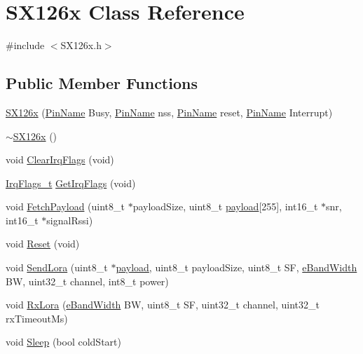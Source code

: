 \hypertarget{class_s_x126x}{}\section{S\+X126x Class Reference}
\label{class_s_x126x}


{\ttfamily \#include $<$S\+X126x.\+h$>$}

\subsection*{Public Member Functions}
\begin{DoxyCompactItemize}
\item 
\mbox{\hyperlink{class_s_x126x_a325ba815822bd31fcae9d4effcc1aea5}{S\+X126x}} (\mbox{\hyperlink{_class_s_t_m32_l0_8h_a5ceb873075d76667eb54dc6a7d2734d1}{Pin\+Name}} Busy, \mbox{\hyperlink{_class_s_t_m32_l0_8h_a5ceb873075d76667eb54dc6a7d2734d1}{Pin\+Name}} nss, \mbox{\hyperlink{_class_s_t_m32_l0_8h_a5ceb873075d76667eb54dc6a7d2734d1}{Pin\+Name}} reset, \mbox{\hyperlink{_class_s_t_m32_l0_8h_a5ceb873075d76667eb54dc6a7d2734d1}{Pin\+Name}} Interrupt)
\item 
\mbox{\hyperlink{class_s_x126x_ade46beffc61c639d93c2cad02b92c902}{$\sim$\+S\+X126x}} ()
\item 
void \mbox{\hyperlink{class_s_x126x_a0e9939c82c76d571d71a69d6941a6780}{Clear\+Irq\+Flags}} (void)
\item 
\mbox{\hyperlink{_define_8h_ab50e1f84d728c6ede52a9606a2a262d5}{Irq\+Flags\+\_\+t}} \mbox{\hyperlink{class_s_x126x_ac50ac9d688ef2647e10d471f3cdf0ec0}{Get\+Irq\+Flags}} (void)
\item 
void \mbox{\hyperlink{class_s_x126x_a53fde8ee3d816f58b1c493195fd96872}{Fetch\+Payload}} (uint8\+\_\+t $\ast$payload\+Size, uint8\+\_\+t \mbox{\hyperlink{structpayload}{payload}}\mbox{[}255\mbox{]}, int16\+\_\+t $\ast$snr, int16\+\_\+t $\ast$signal\+Rssi)
\item 
void \mbox{\hyperlink{class_s_x126x_a062d1439cea26e3e531e5df8ade82f0b}{Reset}} (void)
\item 
void \mbox{\hyperlink{class_s_x126x_a9199137a513971e5af0b5be2637cb19a}{Send\+Lora}} (uint8\+\_\+t $\ast$\mbox{\hyperlink{structpayload}{payload}}, uint8\+\_\+t payload\+Size, uint8\+\_\+t SF, \mbox{\hyperlink{_define_8h_a6cbb491180e131f374cdbe63880c85e1}{e\+Band\+Width}} BW, uint32\+\_\+t channel, int8\+\_\+t power)
\item 
void \mbox{\hyperlink{class_s_x126x_a027376634d0192e48ce57891cef8b6f3}{Rx\+Lora}} (\mbox{\hyperlink{_define_8h_a6cbb491180e131f374cdbe63880c85e1}{e\+Band\+Width}} BW, uint8\+\_\+t SF, uint32\+\_\+t channel, uint32\+\_\+t rx\+Timeout\+Ms)
\item 
void \mbox{\hyperlink{class_s_x126x_a920aa7de87e1b05c47ad1a95002e00c2}{Sleep}} (bool cold\+Start)
\end{DoxyCompactItemize}


